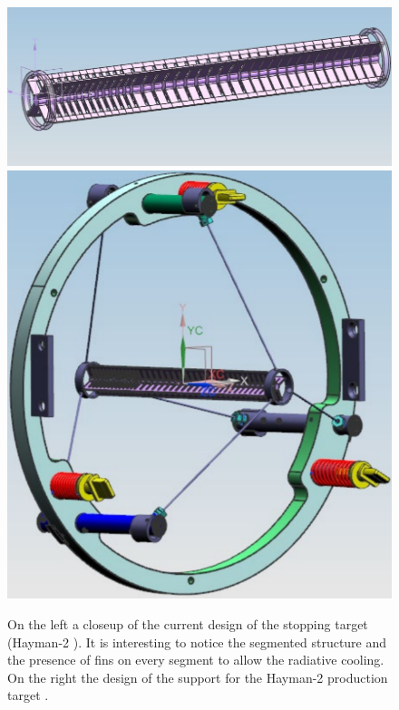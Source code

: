 \documentclass[12pt,a4paper,openright, oneside, titlepage]{book} %
\begin{document}
\begin{figure}[h!]
\centering
\includegraphics[scale=0.45]{Hayman2}\hfill
\includegraphics[scale=0.35]{Hayman2_structure}
\caption{On the left a closeup of the current design of the stopping target (Hayman-2 \cite{Pushka_Hayman2} \cite{bob_Hayman2}). 
It is interesting to notice the segmented structure and the presence of fins on every segment to allow the radiative cooling. 
On the right the design of the support for the Hayman-2 production target \cite{Pushka_Hayman2}.}
\label{_Hayman2}
\end{figure}
\end{document}

